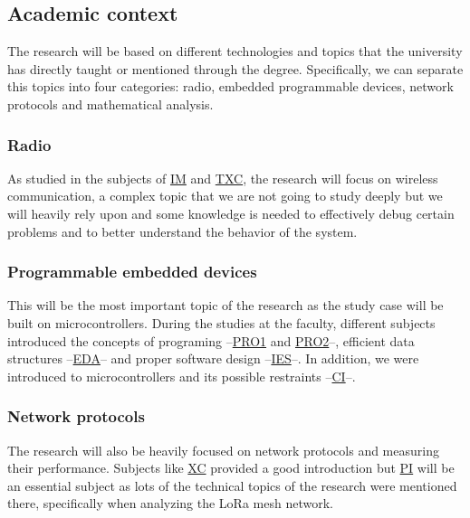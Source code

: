 \subsection{Academic context}
The research will be based on different technologies and topics that the university has directly taught or mentioned through the degree. Specifically, we can separate this topics into four categories: radio, embedded programmable devices, network protocols and mathematical analysis.
\subsubsection{Radio}
As studied in the subjects of \href{https://fib.upc.edu/en/studies/bachelors-degrees/bachelor-degree-informatics-engineering/curriculum/syllabus/IM}{IM} and \href{https://fib.upc.edu/en/studies/bachelors-degrees/bachelor-degree-informatics-engineering/curriculum/syllabus/TXC}{TXC}, the research will focus on wireless communication, a complex topic that we are not going to study deeply but we will heavily rely upon and some knowledge is needed to effectively debug certain problems and to better understand the behavior of the system.
\subsubsection{Programmable embedded devices}
This will be the most important topic of the research as the study case will be built on microcontrollers. During the studies at the faculty, different subjects introduced the concepts of programing –\href{https://fib.upc.edu/en/studies/bachelors-degrees/bachelor-degree-informatics-engineering/curriculum/syllabus/PRO1}{PRO1} and \href{https://fib.upc.edu/en/studies/bachelors-degrees/bachelor-degree-informatics-engineering/curriculum/syllabus/PRO2}{PRO2}–, efficient data structures –\href{https://fib.upc.edu/en/studies/bachelors-degrees/bachelor-degree-informatics-engineering/curriculum/syllabus/EDA}{EDA}– and proper software design –\href{https://fib.upc.edu/en/studies/bachelors-degrees/bachelor-degree-informatics-engineering/curriculum/syllabus/IES}{IES}–. In addition, we were introduced to microcontrollers and its possible restraints –\href{https://fib.upc.edu/en/studies/bachelors-degrees/bachelor-degree-informatics-engineering/curriculum/syllabus/CI}{CI}–.
\subsubsection{Network protocols}
The research will also be heavily focused on network protocols and measuring their performance. Subjects like \href{https://fib.upc.edu/en/studies/bachelors-degrees/bachelor-degree-informatics-engineering/curriculum/syllabus/XC}{XC} provided a good introduction but \href{https://fib.upc.edu/en/studies/bachelors-degrees/bachelor-degree-informatics-engineering/curriculum/syllabus/PI}{PI} will be an essential subject as lots of the technical topics of the research were mentioned there, specifically when analyzing the LoRa mesh network.
